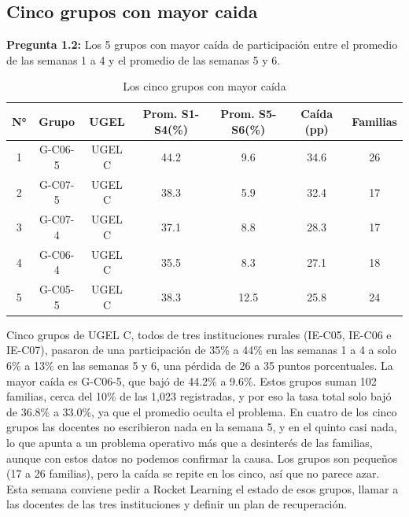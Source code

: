 \documentclass[12pt,a4paper]{article}
\begin{document}
		\subsection{Cinco grupos con mayor caida}

			\noindent \textbf{Pregunta 1.2:} Los 5 grupos con mayor caída de participación entre el promedio de las semanas 1 a 
			4 y el promedio de las semanas 5 y 6. 
		
			\begin{table}[h]
				\centering
				\caption{Los cinco grupos con mayor caída}
				\label{tab: tasa}
				\begin{tabular}{ccccccc}
					\toprule
					N° & Grupo & UGEL  & Prom. S1-S4(\%) & Prom. S5-S6(\%) & Caída (pp) & Familias \\
					\midrule
					1 & G-C06-5 & UGEL C & 44.2 & 9.6  & 34.6 & 26 \\
					2 & G-C07-5 & UGEL C & 38.3 & 5.9  & 32.4 & 17 \\
					3 & G-C07-4 & UGEL C & 37.1 & 8.8  & 28.3 & 17 \\
					4 & G-C06-4 & UGEL C & 35.5 & 8.3  & 27.1 & 18 \\
					5 & G-C05-5 & UGEL C & 38.3 & 12.5 & 25.8 & 24 \\
					\bottomrule
				\end{tabular}
			\end{table}
		
		\noindent Cinco grupos de UGEL C, todos de tres instituciones rurales (IE-C05, IE-C06 e IE-C07), pasaron de 
		una participación de 35\% a 44\% en las semanas 1 a 4 a solo 6\% a 13\% en las semanas 5 y 6, una pérdida de 
		26 a 35 puntos porcentuales. La mayor caída es G-C06-5, que bajó de 44.2\% a 9.6\%. Estos grupos suman 102 familias,
		cerca del 10\% de las 1,023 registradas, y por eso la tasa total solo bajó de 36.8\% a 33.0\%, ya que el 
		promedio oculta el problema. En cuatro de los cinco grupos las docentes no escribieron nada en la semana 5,
		y en el quinto casi nada, lo que apunta a un problema operativo más que a desinterés de las familias, aunque 
		con estos datos no podemos confirmar la causa. Los grupos son pequeños (17 a 26 familias), pero la caída se
		repite en los cinco, así que no parece azar. Esta semana conviene pedir a Rocket Learning el estado de
		esos grupos, llamar a las docentes de las tres instituciones y definir un plan de recuperación.
		
		
\end{document}
